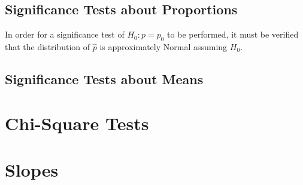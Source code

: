 \documentclass[../AP_Statistics.tex]{subfiles}
\begin{document}
		\section{Significance Tests about Proportions}
			In order for a significance test of $H_0:p = p_0$ to be performed, it must be verified that the distribution of $\hat{p}$ is approximately Normal assuming $H_0$.
			$$$$
		\section{Significance Tests about Means}
		\chapter{Chi-Square Tests}
	\chapter{Slopes}
\end{document}
